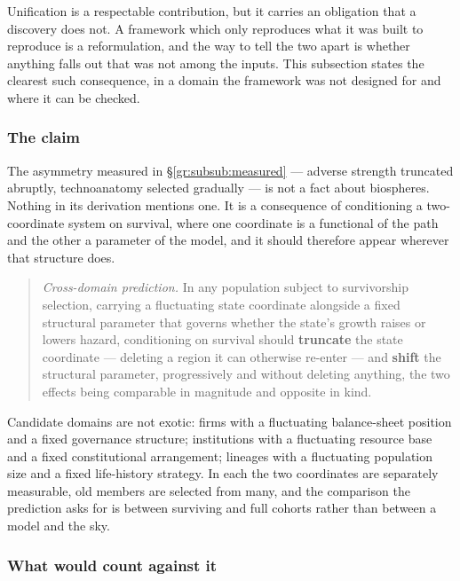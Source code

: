 \documentclass[11pt]{article}
\numberwithin{equation}{section}
\theoremstyle{plain}
\theoremstyle{definition}
\theoremstyle{remark}
\begin{document}
Unification is a respectable contribution, but it carries an obligation
that a discovery does not. A framework which only reproduces what it was
built to reproduce is a reformulation, and the way to tell the two apart
is whether anything falls out that was not among the inputs. This
subsection states the clearest such consequence, in a domain the
framework was not designed for and where it can be checked.

\subsubsection{The claim}\label{gr:subsub:crossclaim}

The asymmetry measured in \S\ref{gr:subsub:measured} --- adverse
strength truncated abruptly, technoanatomy selected gradually --- is not
a fact about biospheres. Nothing in its derivation mentions one. It is a
consequence of conditioning a two-coordinate system on survival, where
one coordinate is a functional of the path and the other a parameter of
the model, and it should therefore appear wherever that structure does.

\begin{quote}
\emph{Cross-domain prediction.} In any population subject to
survivorship selection, carrying a fluctuating state coordinate
alongside a fixed structural parameter that governs whether the state's
growth raises or lowers hazard, conditioning on survival should
\textbf{truncate} the state coordinate --- deleting a region it can
otherwise re-enter --- and \textbf{shift} the structural parameter,
progressively and without deleting anything, the two effects being
comparable in magnitude and opposite in kind.
\end{quote}

Candidate domains are not exotic: firms with a fluctuating balance-sheet
position and a fixed governance structure; institutions with a
fluctuating resource base and a fixed constitutional arrangement;
lineages with a fluctuating population size and a fixed life-history
strategy. In each the two coordinates are separately measurable, old
members are selected from many, and the comparison the prediction asks
for is between surviving and full cohorts rather than between a model
and the sky.

\subsubsection{What would count against it}
\label{gr:subsub:crossfalsify}
\end{document}
